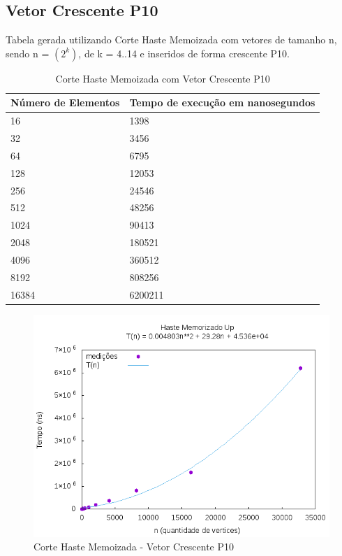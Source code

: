 \documentclass[12pt,a4paper,twoside]{report}
\begin{document}
\subsection{Vetor Crescente P10}
Tabela gerada utilizando Corte Haste Memoizada com vetores de tamanho n, sendo n = $(2^k)$, de k = 4..14 e inseridos de forma crescente P10.
\begin{table}[H]
\centering
\caption{Corte Haste Memoizada com Vetor Crescente P10}
\label{my-label}
\begin{tabular}{|l|l|}
\hline
\multicolumn{1}{|c|}{\textbf{Número de Elementos}} & \multicolumn{1}{c|}{\textbf{Tempo de execução em nanosegundos}} \\ \hline
16 & 1398 \\ \hline
32 & 3456 \\ \hline
64 & 6795 \\ \hline
128 & 12053 \\ \hline
256 & 24546 \\ \hline
512 & 48256 \\ \hline
1024 & 90413 \\ \hline
2048 & 180521 \\ \hline
4096 & 360512 \\ \hline
8192 & 808256 \\ \hline
16384 & 6200211 \\ \hline
\end{tabular}
\end{table}

\begin{figure}[H]
    \centering
    \includegraphics[width=0.7\linewidth]{graficos/CorteHasteMemorizado/CrescenteP10/HasteMemo.png}
  \caption{Corte Haste Memoizada - Vetor Crescente P10}
\end{figure}
\end{document}
